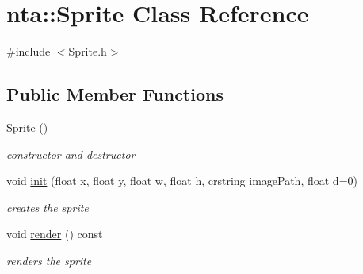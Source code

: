 \hypertarget{classnta_1_1Sprite}{}\section{nta\+:\+:Sprite Class Reference}
\label{classnta_1_1Sprite}


{\ttfamily \#include $<$Sprite.\+h$>$}

\subsection*{Public Member Functions}
\begin{DoxyCompactItemize}
\item 
\mbox{\label{classnta_1_1Sprite_a5d208eb1b82f0a60155887b5f4103dbc}} 
\hyperlink{classnta_1_1Sprite_a5d208eb1b82f0a60155887b5f4103dbc}{Sprite} ()
\begin{DoxyCompactList}\small\item\em constructor and destructor \end{DoxyCompactList}\item 
void \hyperlink{classnta_1_1Sprite_a1054dba693836caca9e755acc530d2fd}{init} (float x, float y, float w, float h, crstring image\+Path, float d=0)
\begin{DoxyCompactList}\small\item\em creates the sprite \end{DoxyCompactList}\item 
\mbox{\label{classnta_1_1Sprite_a01e831cda46d73acd8a4eff3cb56d5d3}} 
void \hyperlink{classnta_1_1Sprite_a01e831cda46d73acd8a4eff3cb56d5d3}{render} () const
\begin{DoxyCompactList}\small\item\em renders the sprite \end{DoxyCompactList}\end{DoxyCompactItemize}
